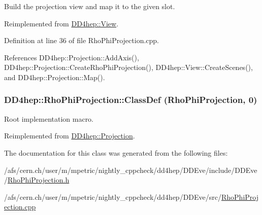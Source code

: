 Build the projection view and map it to the given slot. 

Reimplemented from \hyperlink{class_d_d4hep_1_1_view_ab4e12874a9cb6a599f268b027443c6ce}{DD4hep::View}.

Definition at line 36 of file RhoPhiProjection.cpp.

References DD4hep::Projection::AddAxis(), DD4hep::Projection::CreateRhoPhiProjection(), DD4hep::View::CreateScenes(), and DD4hep::Projection::Map().\hypertarget{class_d_d4hep_1_1_rho_phi_projection_a33fb99400480c317f4e4d9fabf48836c}{
\subsubsection[{ClassDef}]{\setlength{\rightskip}{0pt plus 5cm}DD4hep::RhoPhiProjection::ClassDef ({\bf RhoPhiProjection}, \/  0)}}
\label{class_d_d4hep_1_1_rho_phi_projection_a33fb99400480c317f4e4d9fabf48836c}


Root implementation macro. 

Reimplemented from \hyperlink{class_d_d4hep_1_1_projection_a32d78dc00500fcb000ce25052c96fd62}{DD4hep::Projection}.

The documentation for this class was generated from the following files:\begin{DoxyCompactItemize}
\item 
/afs/cern.ch/user/m/mpetric/nightly\_\-cppcheck/dd4hep/DDEve/include/DDEve/\hyperlink{_rho_phi_projection_8h}{RhoPhiProjection.h}\item 
/afs/cern.ch/user/m/mpetric/nightly\_\-cppcheck/dd4hep/DDEve/src/\hyperlink{_rho_phi_projection_8cpp}{RhoPhiProjection.cpp}\end{DoxyCompactItemize}
